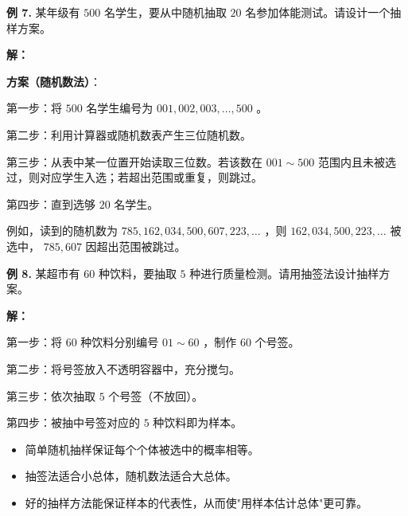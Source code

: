 \begin{workedexamples}


\textbf{例 7.} 某年级有 $500$ 名学生，要从中随机抽取 $20$ 名参加体能测试。请设计一个抽样方案。

\textbf{解：}

\textbf{方案（随机数法）}：

第一步：将 $500$ 名学生编号为 $001, 002, 003, \ldots, 500$ 。

第二步：利用计算器或随机数表产生三位随机数。

第三步：从表中某一位置开始读取三位数。若该数在 $001 \sim 500$ 范围内且未被选过，则对应学生入选；若超出范围或重复，则跳过。

第四步：直到选够 $20$ 名学生。

例如，读到的随机数为 $785, 162, 034, 500, 607, 223, \ldots$ ，则 $162, 034, 500, 223, \ldots$ 被选中， $785, 607$ 因超出范围被跳过。

\textbf{例 8.} 某超市有 $60$ 种饮料，要抽取 $5$ 种进行质量检测。请用抽签法设计抽样方案。

\textbf{解：}

第一步：将 $60$ 种饮料分别编号 $01 \sim 60$ ，制作 $60$ 个号签。

第二步：将号签放入不透明容器中，充分搅匀。

第三步：依次抽取 $5$ 个号签（不放回）。

第四步：被抽中号签对应的 $5$ 种饮料即为样本。

\end{workedexamples}

\begin{keytakeaway}


\begin{itemize}
  \item 简单随机抽样保证每个个体被选中的概率相等。
  \item 抽签法适合小总体，随机数法适合大总体。
  \item 好的抽样方法能保证样本的代表性，从而使"用样本估计总体"更可靠。
\end{itemize}


\end{keytakeaway}

